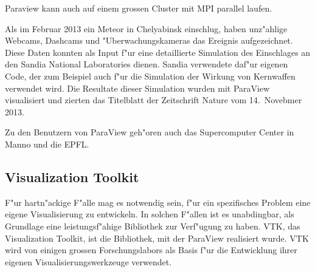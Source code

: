 Paraview kann auch auf einem grossen Cluster mit MPI parallel laufen.

Als im Februar 2013 ein Meteor in Chelyabinsk einschlug, haben unz"ahlige
Webcams, Dashcams und "Uberwachungskameras das Ereignis aufgezeichnet.
Diese Daten konnten als Input f"ur eine detaillierte Simulation
des Einschlages an den Sandia National Laboratories dienen.
Sandia verwendete daf"ur eigenen Code, der zum Beispiel auch f"ur 
die Simulation der Wirkung von Kernwaffen verwendet wird.
Die Resultate dieser Simulation wurden mit ParaView visualisiert
und zierten das Titelblatt der Zeitschrift Nature vom 14.~Novebmer 2013.

Zu den Benutzern von ParaView geh"oren auch das Supercomputer Center 
in Manno und die EPFL. 

\subsection{Visualization Toolkit}
F"ur hartn"ackige F"alle mag es notwendig sein, f"ur ein spezifisches
Problem eine eigene Visualisierung zu entwickeln.
In solchen F"allen ist es unabdingbar, als Grundlage eine leistungsf"ahige
Bibliothek zur Verf"ugung zu haben. 
VTK, das Visualization Toolkit, ist die Bibliothek, mit der ParaView
realisiert wurde.
VTK wird von einigen grossen Forschungslabors als Basis f"ur die
Entwicklung ihrer eigenen Visualisierungswerkzeuge verwendet.




